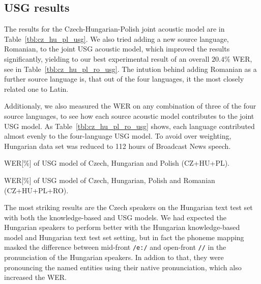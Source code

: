 \documentclass[runningheads,a4paper]{llncs}
\begin{document}
\subsection{USG results}
The results for the Czech-Hungarian-Polish joint acoustic model are in Table~\ref{tbl:cz_hu_pl_usg}.
We also tried adding a new source language, Romanian, to the joint USG acoustic model, which improved the results significantly, yielding to our best experimental result of an overall $20.4\%$ WER, see in Table~\ref{tbl:cz_hu_pl_ro_usg}.
The intution behind adding Romanian as a further source language is, that out of the four languages, it the most closely related one to Latin.

Additionaly, we also measured the WER on any combination of three of the four source languages, to see how each source acoustic model contributes to the joint USG model.
As Table~\ref{tbl:cz_hu_pl_ro_usg} shows, each language contributed almost evenly to the four-language USG model. To avoid over weighting, Hungarian data set was reduced to 112 hours of Broadcast News speech.  
\begin{table}
\parbox{.45\linewidth}{
\centering
\caption{WER[\%] of USG model of Czech, Hungarian and Polish (CZ+HU+PL).}
\label{tbl:cz_hu_pl_usg}
}
\hfill
\parbox{.45\linewidth}{
\centering
\caption{WER[\%] of USG model of Czech, Hungarian, Polish and Romanian (CZ+HU+PL+RO).}
\label{tbl:cz_hu_pl_ro_usg}
}
\end{table}
The most striking results are the Czech speakers on the Hungarian text test set with both the knowledge-based and USG models.
We had expected the Hungarian speakers to perform better with the Hungarian knowledge-based model and Hungarian text test set setting, but in fact the phoneme mapping masked the difference between mid-front \texttt{/e:/} and open-front \texttt{//} in the pronunciation of the Hungarian speakers.
In addion to that, they were pronouncing the named entities using their native pronunciation, which also increased the WER.
\end{document}
